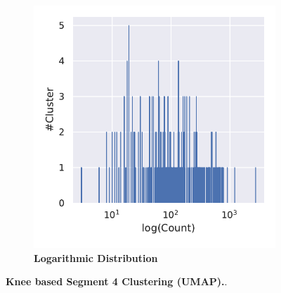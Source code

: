 \begin{figure}[!hbt]
\begin{subfigure}[b]{0.475\textwidth}
    \end{subfigure}
    \hfill
    \begin{subfigure}[b]{0.475\textwidth}
        \caption[Logarithmic Distribution]{\textbf{Logarithmic Distribution}}
        \label{subfig:UMAP_Cluster_Knee_Distribution_log_4}            \includegraphics[width=\textwidth]{UMAP/Cluster_Distribution_Log_Segment_4.pdf}
    \end{subfigure}
    \caption[Knee based Segment 4 Clustering (\Acrshort{UMAP})]{\textbf{Knee based Segment 4 Clustering (\Acrshort{UMAP}).}.}
    \label{fig:UMAP_Cluster_Knee_4}
\end{figure}

